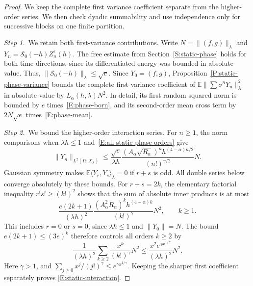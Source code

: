 \documentclass[12pt,oneside,openany]{book}
\numberwithin{equation}{section}
\theoremstyle{nogostyle}
\theoremstyle{definition}
\newcommand{\E}{\mathbb{E}}
\begin{document}
\begin{proof}
  We keep the complete first variance coefficient separate from the
  higher-order series. We then check dyadic summability and use independence
  only for successive blocks on one finite partition.


  \medskip
  \noindent\textit{Step 1.~}We retain both first-variance contributions.
  Write $N = \|(f,g)\|_\lambda$ and $Y_n = \mathcal{S}_0(-h)Z_n^\epsilon(h)$.
  The free estimate from Section~\ref{S:static-phase} holds for both time
  directions, since its differentiated energy was bounded in absolute value.
  Thus, $\|\mathcal{S}_0(-h)\|_\lambda \le \sqrt e$. Since $Y_0 = (f,g)$,
  Proposition~\ref{P:static-phase-variance} bounds the complete first variance
  coefficient of $\E\|\sum\sigma^nY_n\|_\lambda^2$ in absolute value by
  $L_\alpha(h,\lambda)N^2$. In detail, its first random squared norm is bounded
  by $e$ times~\eqref{E:phase-born}, and its second-order mean cross term by
  $2N\sqrt e$ times~\eqref{E:phase-mean}.


  \medskip
  \noindent\textit{Step 2.~}We bound the higher-order interaction series.
  For $n \ge 1$, the norm comparisons when $\lambda h \le 1$
  and~\eqref{E:all-static-phase-orders} give
  \[
    \|Y_n\|_{L^2(\Omega;X_\lambda)}
    \le\frac{\sqrt e}{\lambda h}
    \frac{(A_\alpha\sqrt{R_\alpha})^n h^{(4-\alpha)n/2}}
    {(n!)^{\gamma/2}}N.
  \]
  Gaussian symmetry makes $\E\langle Y_r,Y_s\rangle_\lambda = 0$ if $r+s$ is
  odd. All double series below converge absolutely by these bounds. For $r+s =
  2k$, the elementary factorial inequality $r!s! \ge (k!)^2$ shows that the sum
  of absolute inner products is at most
  \[
    \frac{e(2k+1)}{(\lambda h)^2}
    \frac{(A_\alpha^2R_\alpha)^k h^{(4-\alpha)k}}
    {(k!)^\gamma}N^2,\qquad k\ge1.
  \]
  This includes $r = 0$ or $s = 0$, since $\lambda h \le 1$ and $\|Y_0\| = N$.
  The bound $e(2k+1) \le (3e)^k$ therefore controls all orders $k \ge 2$ by
  \[
    \frac1{(\lambda h)^2}
    \sum_{k\ge2}\frac{x^k}{(k!)^\gamma}N^2
    \le\frac{x^2e^{\gamma x^{1/\gamma}}}{(\lambda h)^2}N^2.
  \]
  Here $\gamma > 1$, and $\sum_{j\ge0}x^j/(j!)^\gamma \le e^{\gamma
  x^{1/\gamma}}$. Keeping the sharper first coefficient separately proves
  \eqref{E:static-interaction}.



\end{proof}
\end{document}
